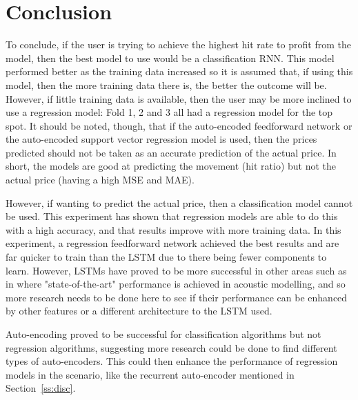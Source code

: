 \documentclass[11pt,a4paper]{article}
\numberwithin{equation}{section}
\begin{document}
\section{Conclusion}
\label{ss:cc}
To conclude, if the user is trying to achieve the highest hit rate to profit from the model, then the best model to use would be a classification RNN. This model performed better as the training data increased so it is assumed that, if using this model, then the more training data there is, the better the outcome will be. However, if little training data is available, then the user may be more inclined to use a regression model: Fold 1, 2 and 3 all had a regression model for the top spot. It should be noted, though, that if the auto-encoded feedforward network or the auto-encoded support vector regression model is used, then the prices predicted should not be taken as an accurate prediction of the actual price. In short, the models are good at predicting the movement (hit ratio) but not the actual price (having a high MSE and MAE).

However, if wanting to predict the actual price, then a classification model cannot be used. This experiment has shown that regression models are able to do this with a high accuracy, and that results improve with more training data. In this experiment, a regression feedforward network achieved the best results and are far quicker to train than the LSTM due to there being fewer components to learn. However, LSTMs have proved to be more successful in other areas such as in \cite{sakda} where "state-of-the-art"\cite{sakda} performance is achieved in acoustic modelling, and so more research needs to be done here to see if their performance can be enhanced by other features or a different architecture to the LSTM used.

Auto-encoding proved to be successful for classification algorithms but not regression algorithms, suggesting more research could be done to find different types of auto-encoders. This could then enhance the performance of regression models in the scenario, like the recurrent auto-encoder mentioned in Section~\ref{ss:disc}.
\end{document}
